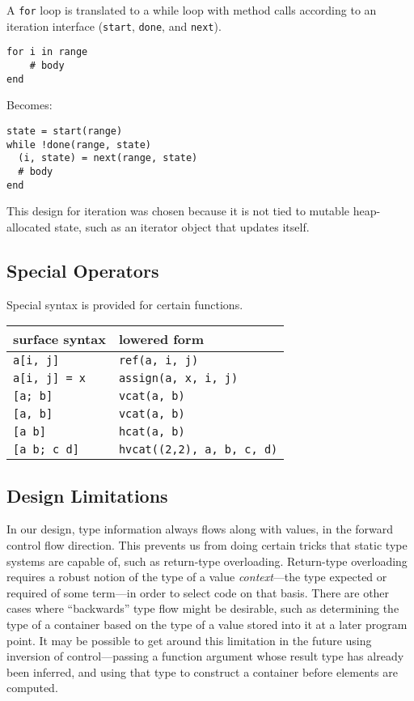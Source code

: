 \documentclass[9pt]{sigplanconf}
\begin{document}
A {\tt for} loop is translated to a while loop with method calls according
to an iteration interface ({\tt start}, {\tt done}, and {\tt next}).

\begin{verbatim}
for i in range
    # body
end
\end{verbatim}

Becomes:

\begin{verbatim}
state = start(range)
while !done(range, state)
  (i, state) = next(range, state)
  # body
end
\end{verbatim}

This design for iteration was chosen because it is not tied to mutable
heap-allocated state, such as an iterator object that updates itself.

\subsection{Special Operators}

Special syntax is provided for certain functions.

\begin{tabular}{|l|l|}\hline
surface syntax     & lowered form \\\hline \hline
{\tt a[i, j]}      & {\tt ref(a, i, j)} \\\hline
{\tt a[i, j] = x}  & {\tt assign(a, x, i, j)} \\\hline
{\tt [a; b]}       & {\tt vcat(a, b)} \\\hline
{\tt [a, b]}       & {\tt vcat(a, b)} \\\hline
{\tt [a b]}        & {\tt hcat(a, b)} \\\hline
{\tt [a b; c d]}   & {\tt hvcat((2,2), a, b, c, d)}\\\hline
\end{tabular}


\subsection{Design Limitations}

In our design, type information always flows along with values, in the
forward control flow direction. This prevents us from doing certain tricks
that static type systems are capable of, such as return-type overloading.
Return-type overloading requires a robust notion of the type of a value
\emph{context}---the type expected or required of some term---in order to
select code on that basis. There are other cases where ``backwards'' type
flow might be desirable, such as determining the type of a container based
on the type of a value stored into it at a later program point. It may be
possible to get around this limitation in the future using inversion of
control---passing a function argument whose result type has already been
inferred, and using that type to construct a container before elements are
computed.
\end{document}
